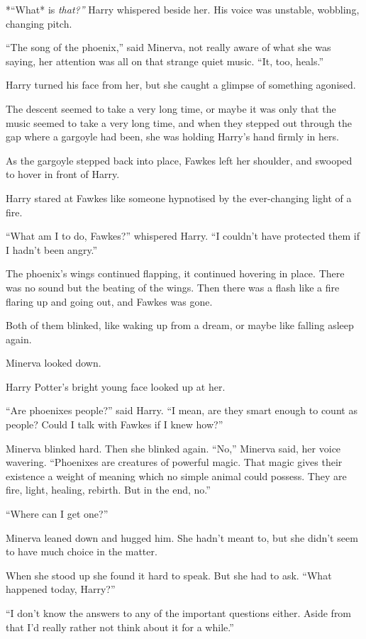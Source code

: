*``What* is \emph{that?''} Harry whispered beside her. His voice was
unstable, wobbling, changing pitch.

``The song of the phoenix,'' said Minerva, not really aware of what she
was saying, her attention was all on that strange quiet music. ``It,
too, heals.''

Harry turned his face from her, but she caught a glimpse of something
agonised.

The descent seemed to take a very long time, or maybe it was only that
the music seemed to take a very long time, and when they stepped out
through the gap where a gargoyle had been, she was holding Harry's hand
firmly in hers.

As the gargoyle stepped back into place, Fawkes left her shoulder, and
swooped to hover in front of Harry.

Harry stared at Fawkes like someone hypnotised by the ever-changing
light of a fire.

``What am I to do, Fawkes?'' whispered Harry. ``I couldn't have
protected them if I hadn't been angry.''

The phoenix's wings continued flapping, it continued hovering in place.
There was no sound but the beating of the wings. Then there was a flash
like a fire flaring up and going out, and Fawkes was gone.

Both of them blinked, like waking up from a dream, or maybe like falling
asleep again.

Minerva looked down.

Harry Potter's bright young face looked up at her.

``Are phoenixes people?'' said Harry. ``I mean, are they smart enough to
count as people? Could I talk with Fawkes if I knew how?''

Minerva blinked hard. Then she blinked again. ``No,'' Minerva said, her
voice wavering. ``Phoenixes are creatures of powerful magic. That magic
gives their existence a weight of meaning which no simple animal could
possess. They are fire, light, healing, rebirth. But in the end, no.''

``Where can I get one?''

Minerva leaned down and hugged him. She hadn't meant to, but she didn't
seem to have much choice in the matter.

When she stood up she found it hard to speak. But she had to ask. ``What
happened today, Harry?''

``I don't know the answers to any of the important questions either.
Aside from that I'd really rather not think about it for a while.''

